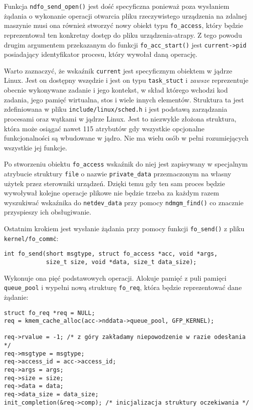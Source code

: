 \documentclass[10pt]{article}
\begin{document}
Funkcja \texttt{ndfo\_send\_open()} jest dość specyficzna ponieważ poza wysłaniem żądania o wykonanie operacji otwarcia pliku rzeczywistego urządzenia na zdalnej maszynie musi ona również stworzyć nowy obiekt typu \texttt{fo\_access}, który będzie reprezentował ten konkretny dostęp do pliku urządzenia-atrapy. Z tego powodu drugim argumentem przekazanym do funkcji \texttt{fo\_acc\_start()} jest \texttt{current-\textgreater{}pid} posiadający identyfikator procesu, który wywołał daną operację.

Warto zaznaczyć, że wskaźnik \texttt{current} jest specyficznym obiektem w jądrze Linux. Jest on dostępny wszędzie i jest on typu \texttt{task\_stuct} i \emph{zawsze} reprezentuje obecnie wykonywane zadanie i jego kontekst, w skład którego wchodzi kod zadania, jego pamięć wirtualna, stos i wiele innych elementów. Struktura ta jest zdefiniowana w pliku \texttt{include/linux/sched.h} i jest podstawą zarządzania procesami oraz wątkami w jądrze Linux. Jest to niezwykle złożona struktura, która może osiągać nawet 115 atrybutów gdy wszystkie opcjonalne funkcjonalności są wbudowane w jądro. Nie ma wielu osób w pełni rozumiejących wszystkie jej funkcje.

Po stworzeniu obiektu \texttt{fo\_access} wskaźnik do niej jest zapisywany w specjalnym atrybucie struktury \texttt{file} o nazwie \texttt{private\_data} przeznaczonym na własny użytek przez sterowniki urządzeń. Dzięki temu gdy ten sam proces będzie wywoływał kolejne operacje plikowe nie będzie trzeba za każdym razem wyszukiwać wskaźnika do \texttt{netdev\_data} przy pomocy \texttt{ndmgm\_find()} co znacznie przyspieszy ich obsługiwanie.

Ostatnim krokiem jest wysłanie żądania przy pomocy funkcji \texttt{fo\_send()} z pliku \texttt{kernel/fo\_comm\.c}:

\begin{verbatim}
int fo_send(short msgtype, struct fo_access *acc, void *args,
            size_t size, void *data, size_t data_size);
\end{verbatim}

Wykonuje ona pięć podstawowych operacji. Alokuje pamięć z puli pamięci \texttt{queue\_pool} i wypełni nową strukturę \texttt{fo\_req}, która będzie reprezentować dane żądanie:

\begin{verbatim}
struct fo_req *req = NULL;
req = kmem_cache_alloc(acc->nddata->queue_pool, GFP_KERNEL);

req->rvalue = -1; /* z góry zakładamy niepowodzenie w razie odesłania */
req->msgtype = msgtype;
req->access_id = acc->access_id;
req->args = args;
req->size = size;
req->data = data;
req->data_size = data_size;
init_completion(&req->comp); /* inicjalizacja struktury oczekiwania */
\end{verbatim}
\end{document}
